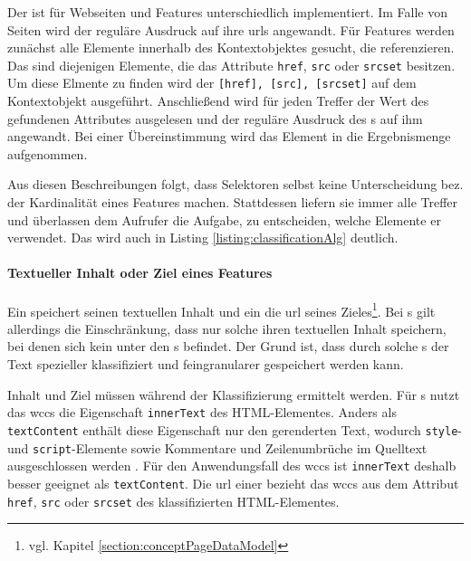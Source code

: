     Der {\urlSelector} ist für Webseiten und Features unterschiedlich implementiert.
    Im Falle von Seiten wird der reguläre Ausdruck auf ihre \glspl{url} angewandt.
    Für Features werden zunächst alle Elemente innerhalb des Kontextobjektes gesucht, die {\resources} referenzieren.
    Das sind diejenigen Elemente, die das Attribute \texttt{href}, \texttt{src} oder \texttt{srcset} besitzen.
    Um diese Elmente zu finden wird der {\cssSelector} \texttt{[href], [src], [srcset]} auf dem Kontextobjekt ausgeführt.
    Anschließend wird für jeden Treffer der Wert des gefundenen Attributes ausgelesen
    und der reguläre Ausdruck des {\urlSelector}s auf ihm angewandt.
    Bei einer Übereinstimmung wird das Element in die Ergebnismenge aufgenommen.

    Aus diesen Beschreibungen folgt, dass Selektoren selbst keine Unterscheidung bez.
    der Kardinalität eines Features machen.
    Stattdessen liefern sie immer alle Treffer und überlassen dem Aufrufer die Aufgabe, zu entscheiden,
    welche Elemente er verwendet.
    Das wird auch in Listing \ref{listing:classificationAlg} deutlich.

    \paragraph{Textueller Inhalt oder Ziel eines Features}
    Ein {\contentFeature} speichert seinen textuellen Inhalt und ein {}
    die \gls{url} seines Zieles\footnote{vgl. Kapitel \ref{section:conceptPageDataModel}}.
    Bei {\contentFeature}s gilt allerdings die Einschränkung, dass nur solche ihren textuellen Inhalt speichern,
    bei denen sich kein {\contentFeature} unter den {\childFeature}s befindet.
    Der Grund ist, dass durch solche {\childFeature}s der Text spezieller klassifiziert und
    feingranularer gespeichert werden kann.

    Inhalt und Ziel müssen während der Klassifizierung ermittelt werden.
    Für {\contentFeature}s nutzt das \gls{wccs} die Eigenschaft \texttt{innerText} des HTML-Elementes.
    Anders als \texttt{textContent} enthält diese Eigenschaft nur den gerenderten Text,
    wodurch \texttt{style}- und \texttt{script}-Elemente sowie Kommentare und Zeilenumbrüche im Quelltext
    ausgeschlossen werden
    \cite[Kapitel 3.2.7]{whatwg:html}.
    Für den Anwendungsfall des \gls{wccs} ist \texttt{innerText} deshalb besser geeignet als \texttt{textContent}.
    Die \gls{url} einer {\resource} bezieht das \gls{wccs} aus dem Attribut
    \texttt{href}, \texttt{src} oder \texttt{srcset} des klassifizierten HTML-Elementes.

